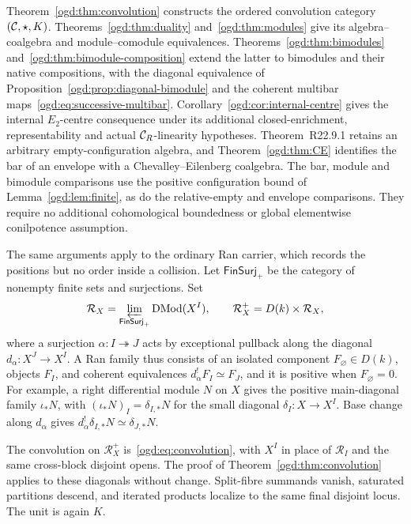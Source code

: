 Theorem~\ref{ogd:thm:convolution} constructs the ordered convolution category \((\mathcal C,\star,K)\).
Theorems~\ref{ogd:thm:duality} and~\ref{ogd:thm:modules} give its algebra--coalgebra and module--comodule equivalences.
Theorems~\ref{ogd:thm:bimodules} and~\ref{ogd:thm:bimodule-composition} extend the latter to bimodules and their native compositions, with the diagonal equivalence of Proposition~\ref{ogd:prop:diagonal-bimodule} and the coherent multibar maps~\eqref{ogd:eq:successive-multibar}.
Corollary~\ref{ogd:cor:internal-centre} gives the internal \(E_2\)-centre consequence under its additional closed-enrichment, representability and actual \(\mathcal C_R\)-linearity hypotheses.
Theorem~\textup{R22.9.1} retains an arbitrary empty-configuration algebra, and Theorem~\ref{ogd:thm:CE} identifies the bar of an envelope with a Chevalley--Eilenberg coalgebra.
The bar, module and bimodule comparisons use the positive configuration bound of Lemma~\ref{ogd:lem:finite}, as do the relative-empty and envelope comparisons.
They require no additional cohomological boundedness or global elementwise conilpotence assumption.

The\label{ogd:def:ordinary-ran-coefficient-category} same arguments apply to the ordinary Ran carrier, which records the positions but no order inside a collision.
Let \(\mathsf{FinSurj}_+\) be the category of nonempty finite sets and surjections.
Set
\[
 \mathcal R_X=\varprojlim_{\mathsf{FinSurj}_+}\operatorname{DMod}(X^I),
 \qquad \mathcal R_X^+=D(k)\times\mathcal R_X,
\]
where a surjection \(\alpha:I\twoheadrightarrow J\) acts by exceptional pullback along the diagonal \(d_\alpha:X^J\to X^I\).
A Ran family thus consists of an isolated component \(F_\varnothing\in D(k)\), objects \(F_I\), and coherent equivalences \(d_\alpha^!F_I\simeq F_J\), and it is positive when \(F_\varnothing=0\).
For example, a right differential module \(N\) on \(X\) gives the positive main-diagonal family \(\iota_*N\), with \((\iota_*N)_I=\delta_{I,*}N\) for the small diagonal \(\delta_I:X\to X^I\).
Base change along \(d_\alpha\) gives \(d_\alpha^!\delta_{I,*}N\simeq\delta_{J,*}N\).

The convolution on \(\mathcal R_X^+\) is~\eqref{ogd:eq:convolution}, with \(X^I\) in place of \(\mathscr R_I\) and the same cross-block disjoint opens.
The proof of Theorem~\ref{ogd:thm:convolution} applies to these diagonals without change.
Split-fibre summands vanish, saturated partitions descend, and iterated products localize to the same final disjoint locus.
The unit is again \(K\).

